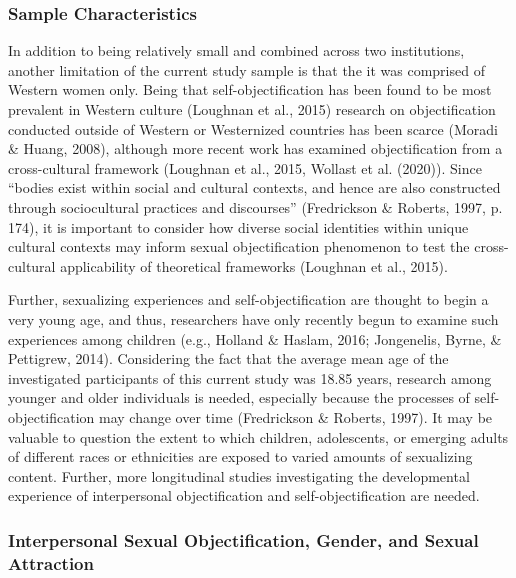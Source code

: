 \documentclass[man]{apa6}
\begin{document}
\subsubsection{Sample Characteristics}\label{sample-characteristics}

In addition to being relatively small and combined across two
institutions, another limitation of the current study sample is that the
it was comprised of Western women only. Being that self-objectification
has been found to be most prevalent in Western culture (Loughnan et al.,
2015) research on objectification conducted outside of Western or
Westernized countries has been scarce (Moradi \& Huang, 2008), although
more recent work has examined objectification from a cross-cultural
framework (Loughnan et al., 2015, Wollast et al. (2020)). Since
\enquote{bodies exist within social and cultural contexts, and hence are
also constructed through sociocultural practices and discourses}
(Fredrickson \& Roberts, 1997, p. 174), it is important to consider how
diverse social identities within unique cultural contexts may inform
sexual objectification phenomenon to test the cross-cultural
applicability of theoretical frameworks (Loughnan et al., 2015).

Further, sexualizing experiences and self-objectification are thought to
begin a very young age, and thus, researchers have only recently begun
to examine such experiences among children (e.g., Holland \& Haslam,
2016; Jongenelis, Byrne, \& Pettigrew, 2014). Considering the fact that
the average mean age of the investigated participants of this current
study was 18.85 years, research among younger and older individuals is
needed, especially because the processes of self-objectification may
change over time (Fredrickson \& Roberts, 1997). It may be valuable to
question the extent to which children, adolescents, or emerging adults
of different races or ethnicities are exposed to varied amounts of
sexualizing content. Further, more longitudinal studies investigating
the developmental experience of interpersonal objectification and
self-objectification are needed.

\subsubsection{Interpersonal Sexual Objectification, Gender, and Sexual
Attraction}\label{interpersonal-sexual-objectification-gender-and-sexual-attraction}
\end{document}
